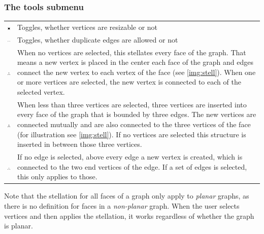 \subsubsection{The tools submenu}
\begin{tabular}{p{}p{}}
\includegraphics[scale=0.6]{figures/icons/resize_nodes.png}& Toggles, whether vertices are resizable or not\\
\includegraphics[scale=0.6]{figures/icons/doubleEdges.png}& Toggles, whether duplicate edges are allowed or not\\
\includegraphics[scale=0.6]{figures/icons/stellation.png}& When no vertices are selected, this stellates every face of the graph. That means a new vertex is placed in the center each face of the graph and edges connect the new vertex to each vertex of the face (see \autoref{img:stell}). When one or more vertices are selected, the new vertex is connected to each of the selected vertex.\\
\includegraphics[scale=0.6]{figures/icons/three_stellation.png}& When less than three vertices are selected, three vertices are inserted into every face of the graph that is bounded by three edges. The new vertices are connected mutually and are also connected to the three vertices of the face (for illustration see \autoref{img:stell}). If no vertices are selected this structure is inserted in between those three vertices.\\
\includegraphics[scale=0.6]{figures/icons/edgeStellation.png}& If no edge is selected, above every edge a new vertex is created, which is connected to the two end vertices of the edge. If a set of edges is selected, this only applies to those.\\
\end{tabular}
Note that the stellation for all faces of a graph only apply to \textit{planar} graphs, as there is no definition for faces in a \textit{non-planar} graph. When the user selects vertices and then applies the stellation, it works regardless of whether the graph is planar.
